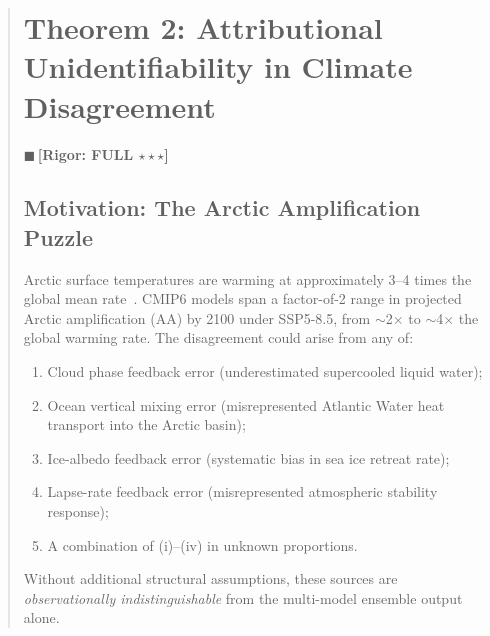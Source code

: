 \documentclass[11pt,a4paper]{article}
\theoremstyle{plain}
\theoremstyle{definition}
\theoremstyle{remark}
\newcommand{\rigorFull}{{\color{rigorFull}$\blacksquare$\,\textbf{[Rigor: FULL $\star\star\star$]}}}
\begin{document}
\begin{abstract}
\section{Theorem 2: Attributional Unidentifiability in Climate Disagreement}
\label{sec:unidentifiability}
\rigorFull
\subsection{Motivation: The Arctic Amplification Puzzle}
Arctic surface temperatures are warming at approximately 3--4 times the global
mean rate~\cite{rantanen2022}. CMIP6 models span a factor-of-2 range in
projected Arctic amplification (AA) by 2100 under SSP5-8.5, from $\sim$2$\times$
to $\sim$4$\times$ the global warming rate. The disagreement could arise from
any of:
\begin{enumerate}[label=(\roman*)]
  \item Cloud phase feedback error (underestimated supercooled liquid water);
  \item Ocean vertical mixing error (misrepresented Atlantic Water heat
    transport into the Arctic basin);
  \item Ice-albedo feedback error (systematic bias in sea ice retreat rate);
  \item Lapse-rate feedback error (misrepresented atmospheric stability
    response);
  \item A combination of (i)--(iv) in unknown proportions.
\end{enumerate}
Without additional structural assumptions, these sources are \emph{observationally
indistinguishable} from the multi-model ensemble output alone.

\end{abstract}
\end{document}

